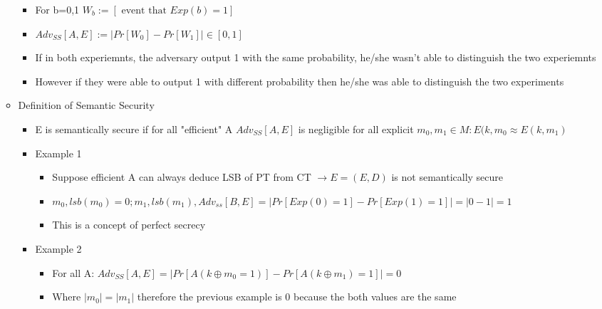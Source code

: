 \documentclass[]{article}
\begin{document}
\begin{itemize}
\begin{itemize}
\begin{itemize}
			\item For b=0,1 $W_{b} := [\text{ event that } Exp(b) = 1]$
			\item $Adv_{SS}[A,E] := | Pr[W_{0}] - Pr[W_{1}] | \in [0,1]$
			\item If in both experiemnts, the adversary output 1 with the same probability, he/she wasn't able to distinguish the two experiemnts
			\item However if they were able to output 1 with different probability then he/she was able to distinguish the two experiments
		\end{itemize}
		\item Definition of Semantic Security
		\begin{itemize}
			\item E is semantically secure if for all "efficient" A $Adv_{SS}[A,E]$ is negligible for all explicit $m_{0}, m_{1} \in M: {E(k,m_{0} \approx {E(k,m_{1})}}$
			\item Example 1
			\begin{itemize}
				\item Suppose efficient A can always deduce LSB of PT from CT $ \rightarrow E = (E,D)$ is not semantically secure
				\item $m_{0}, lsb(m_{0}) = 0; m_{1}, lsb(m_{1}), Adv_{ss}[B,E] = |Pr[Exp(0) = 1] - Pr[Exp(1) = 1]| = |0-1| = 1$
				\item This is a concept of perfect secrecy
			\end{itemize}
			\item Example 2
			\begin{itemize}
				\item For all A: $Adv_{SS}[A,E] = |Pr[A(k \oplus m_{0}=1)] - Pr[A(k \oplus m_{1}) = 1]| = 0$
				\item Where $|m_{0}| = |m_{1}|$ therefore the previous example is 0 because the both values are the same
			\end{itemize}
		\end{itemize}
	\end{itemize}
\end{itemize}
\end{document}
